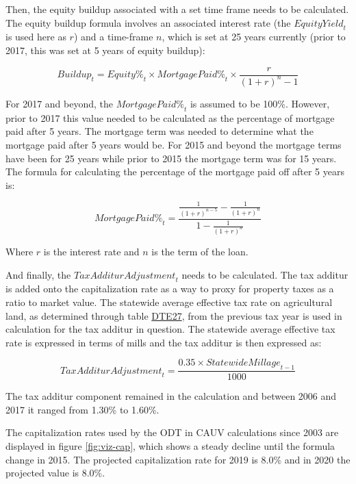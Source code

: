 \documentclass[]{article}
\begin{document}
Then, the equity buildup associated with a set time frame needs to be
calculated. The equity buildup formula involves an associated interest
rate (the \({Equity Yield}_t\) is used here as \(r\)) and a time-frame
\(n\), which is set at 25 years currently (prior to 2017, this was set
at 5 years of equity buildup):

\[ {Buildup}_t = {Equity \%}_t \times {Mortgage Paid \%}_t \times \frac{r}{(1 + r)^n - 1} \]

For 2017 and beyond, the \({Mortgage Paid \%}_t\) is assumed to be
100\%. However, prior to 2017 this value needed to be calculated as the
percentage of mortgage paid after 5 years. The mortgage term was needed
to determine what the mortgage paid after 5 years would be. For 2015 and
beyond the mortgage terms have been for 25 years while prior to 2015 the
mortgage term was for 15 years. The formula for calculating the
percentage of the mortgage paid off after 5 years is:

\[ {Mortgage Paid \%}_t = \frac{ \frac{1}{ (1 + r)^{n-5} } - \frac{1}{ (1 + r)^n} }{ 1 - \frac{1}{(1 + r)^n} } \]

Where \(r\) is the interest rate and \(n\) is the term of the loan.

And finally, the \({Tax Additur Adjustment}_t\) needs to be calculated.
The tax additur is added onto the capitalization rate as a way to proxy
for property taxes as a ratio to market value. The statewide average
effective tax rate on agricultural land, as determined through table
\href{https://www.tax.ohio.gov/tax_analysis/tax_data_series/publications_tds_property.aspx\#Allpropertytaxes}{DTE27},
from the previous tax year is used in calculation for the tax additur in
question. The statewide average effective tax rate is expressed in terms
of mills and the tax additur is then expressed as:

\[ {Tax Additur Adjustment}_t = \frac{0.35 \times {Statewide Millage}_{t-1} }{1000} \]

The tax additur component remained in the calculation and between 2006
and 2017 it ranged from 1.30\% to 1.60\%.

The capitalization rates used by the ODT in CAUV calculations since 2003
are displayed in figure \ref{fig:viz-cap}, which shows a steady decline
until the formula change in 2015. The projected capitalization rate for
2019 is 8.0\% and in 2020 the projected value is 8.0\%.
\end{document}
